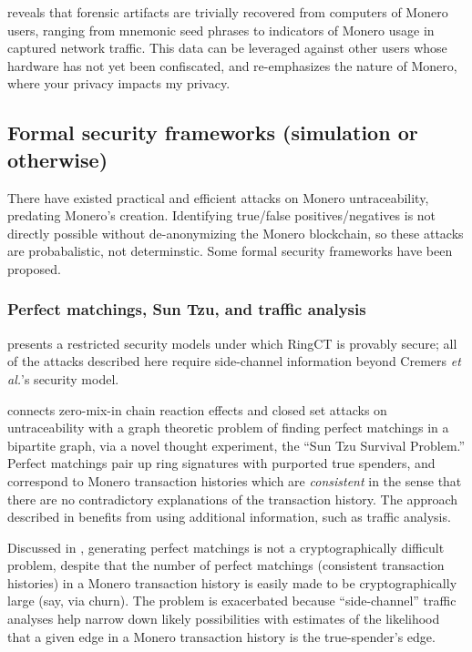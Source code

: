 \documentclass{article}
\theoremstyle{definition}
\begin{document}
\cite{koerhuis2020forensic} reveals that forensic artifacts are trivially recovered from computers of Monero users, ranging from mnemonic seed phrases to indicators of Monero usage in captured network traffic.
This data can be leveraged against other users whose hardware has not yet been confiscated, and re-emphasizes the nature of Monero, where your privacy impacts my privacy.


\subsection{Formal security frameworks (simulation or otherwise)}

There have existed practical and efficient attacks on Monero untraceability, predating Monero's creation.
Identifying true/false positives/negatives is not directly possible without de-anonymizing the Monero blockchain, so these attacks are probabalistic, not determinstic.
Some formal security frameworks have been proposed.


\subsubsection{Perfect matchings, Sun Tzu, and traffic analysis}

\cite{cremers2024holistic} presents a restricted security models under which RingCT is provably secure; all of the attacks described here require side-channel information beyond Cremers \textit{et al.}'s security model.

\cite{yu2019re} connects zero-mix-in chain reaction effects and closed set attacks on untraceability with a graph theoretic problem of finding perfect matchings in a bipartite graph, via a novel thought experiment, the ``Sun Tzu Survival Problem.''
Perfect matchings pair up ring signatures with purported true spenders, and correspond to Monero transaction histories which are \textit{consistent} in the sense that there are no contradictory explanations of the transaction history.
The approach described in \cite{yu2019re} benefits from using additional information, such as traffic analysis.

Discussed in \cite{goodell2019konferenco}, generating perfect matchings is not a cryptographically difficult problem, despite that the number of perfect matchings (consistent transaction histories) in a Monero transaction history is easily made to be cryptographically large (say, via churn).
The problem is exacerbated because ``side-channel'' traffic analyses help narrow down likely possibilities with estimates of the likelihood that a given edge in a Monero transaction history is the true-spender's edge.
\end{document}
